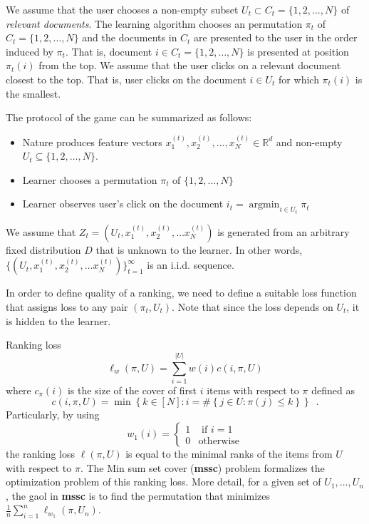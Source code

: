 \documentclass{article}
\newcommand{\R}{\mathbb{R}}
\DeclareMathOperator*{\argmin}{argmin}
\begin{document}
We assume that the user chooses a non-empty subset $U_t
\subset C_t = \{1,2,\dots,N\}$ of \emph{relevant documents}. The learning
algorithm chooses an permutation $\pi_t$ of $C_t = \{1,2,\dots,N\}$ and the
documents in $C_t$ are presented to the user in the order induced by $\pi_t$.
That is, document $i \in C_t = \{1,2,\dots,N\}$ is presented at position
$\pi_t(i)$ from the top. We assume that the user clicks on a relevant document
closest to the top. That is, user clicks on the document $i \in U_t$ for which
$\pi_t(i)$ is the smallest.

The protocol of the game can be summarized as follows:

\begin{itemize}
\item Nature produces feature vectors
$x^{(t)}_1, x^{(t)}_2, \dots, x^{(t)}_N \in \R^d$
and non-empty $U_t \subseteq \{1,2,\dots,N\}$.
\item Learner chooses a permutation $\pi_t$ of $\{1,2,\dots,N\}$
\item Learner observes user's click on the document $i_t = \argmin_{i \in U_t} \pi_t$
\end{itemize}

We assume that $Z_t = (U_t, x_1^{(t)}, x_2^{(t)}, \dots x_N^{(t)})$ is generated from
an arbitrary fixed distribution $D$ that is unknown to the learner.
In other words, $\{(U_t, x_1^{(t)}, x_2^{(t)}, \dots
x_N^{(t)})\}_{t=1}^\infty$ is an i.i.d. sequence.

In order to define quality of a ranking, we need to define a suitable loss
function that assigns loss to any pair $(\pi_t, U_t)$. Note that since the loss
depends on $U_t$, it is hidden to the learner.

Ranking loss
\[
\ell_w ( \pi , U ) = \sum_{i=1}^{| U |} w(i) c(i, \pi, U)
\]
where $c_{\pi}(i)$ is the size of the cover of first $i$ items with respect to $\pi$ defined as
\[
c(i, \pi, U ) = \min \left\{ k\in [N] : i = \#\left\{ j \in U : \pi(j) \le k\right\} \right\} \enspace .
\]
Particularly, by using
\[
w_1 ( i )  =
\begin{cases}
1 & \mbox{ if } i = 1 \\
0 & \mbox{otherwise}
\end{cases}
\]
the ranking loss $\ell ( \pi , U )$ is equal to the minimal ranks of the items from $U$ with respect to $\pi$. The Min sum set cover ({\bf mssc}) problem formalizes the optimization problem of this ranking loss. More detail, for a given set of $U_1, \dots, U_n$, the gaol in {\bf mssc} is to find the permutation that minimizes
$\tfrac{1}{n}\sum_{i=1}^{n} \ell_{w_1} ( \pi, U_n )$.
\end{document}
